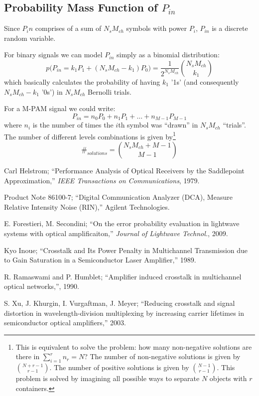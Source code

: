 \documentclass[a4paper]{article}
\begin{document}
\subsection{Probability Mass Function of $P_{in}$}
Since $P_in$ comprises of a sum of $N_sM_{ch}$ symbols with power $P_i$, $P_{in}$ is a discrete random variable.

For binary signals we can model $P_{in}$ simply as a binomial distribution:
\begin{equation}
p\Big(P_{in} = k_1P_1 + (N_sM_{ch} - k_1)P_0\Big) = \frac{1}{2^{N_sM_{ch}}}\binom{N_sM_{ch}}{k_1}
\end{equation}
which basically calculates the probability of having $k_1$ '1s' (and consequently $N_sM_{ch}-k_1$ '0s') in $N_sM_{ch}$ Bernolli trials.

For a M-PAM signal we could write:
\begin{equation}
P_{in} = n_0P_0 + n_1P_1 + \ldots + n_{M-1}P_{M-1}
\end{equation}
where $n_i$ is the number of times the $i$th symbol was ``drawn'' in $N_sM_{ch}$ ``trials''. The number of different levels combinations is given by\footnote{This is equivalent to solve the problem: how many non-negative solutions are there in $\sum_{i = 1}^r n_r = N$? The number of non-negative solutions is given by $\binom{N+r-1}{r-1}$. The number of positive solutions is given by $\binom{N-1}{r-1}$. This problem is solved by imagining all possible ways to separate $N$ objects with $r$ containers.}
\begin{equation}
\#_{solutions} = \binom{N_sM_{ch}+M-1}{M-1}
\end{equation}


\begin{thebibliography}{9}
	
	 Carl Helstrom; ``Performance Analysis of Optical Receivers by the Saddlepoint Approximation,'' \emph{IEEE Transactions on Communications}, 1979.
		
	 Product Note 86100-7; ``Digital Communication Analyzer (DCA), Measure Relative Intensity Noise (RIN),'' Agilent Technologies. 
	
	 E. Forestieri, M. Secondini; ``On the error probability evaluation in lightwave systems with optical amplificaiton,'' \emph{Journal of Lightwave Technol.}, 2009.
	
	 Kyo Inoue; ``Crosstalk and Its Power Penalty in Multichannel Transmission due to Gain Saturation in a Semiconductor Laser Amplifier,''	1989.
	
	 R. Ramaswami and P. Humblet; ``Amplifier induced crosstalk in multichannel optical networks,'', 1990.
	
	 S. Xu, J. Khurgin, I. Vurgaftman, J. Meyer; ``Reducing crosstalk and signal distortion in wavelength-division multiplexing by increasing carrier lifetimes in semiconductor optical amplifiers,'' 2003.
\end{thebibliography}
\end{document}
